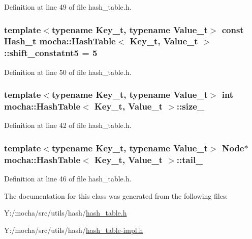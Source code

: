 Definition at line 49 of file hash\_\-table.h.

\hypertarget{classmocha_1_1_hash_table_a0c9f14cc6a29009848ff5e22ff5c77ae}{
\subsubsection[{shift\_\-constatnt5}]{\setlength{\rightskip}{0pt plus 5cm}template$<$typename Key\_\-t, typename Value\_\-t$>$ const {\bf Hash\_\-t} {\bf mocha::HashTable}$<$ Key\_\-t, Value\_\-t $>$::{\bf shift\_\-constatnt5} = 5}}
\label{classmocha_1_1_hash_table_a0c9f14cc6a29009848ff5e22ff5c77ae}


Definition at line 50 of file hash\_\-table.h.

\hypertarget{classmocha_1_1_hash_table_acfaea92a2c538b293ef7211b1018ef8e}{
\subsubsection[{size\_\-}]{\setlength{\rightskip}{0pt plus 5cm}template$<$typename Key\_\-t, typename Value\_\-t$>$ int {\bf mocha::HashTable}$<$ Key\_\-t, Value\_\-t $>$::{\bf size\_\-}}}
\label{classmocha_1_1_hash_table_acfaea92a2c538b293ef7211b1018ef8e}


Definition at line 42 of file hash\_\-table.h.

\hypertarget{classmocha_1_1_hash_table_a2a2427ab0f6c9e70b381e9915d3e64ef}{
\subsubsection[{tail\_\-}]{\setlength{\rightskip}{0pt plus 5cm}template$<$typename Key\_\-t, typename Value\_\-t$>$ {\bf Node}$\ast$ {\bf mocha::HashTable}$<$ Key\_\-t, Value\_\-t $>$::{\bf tail\_\-}}}
\label{classmocha_1_1_hash_table_a2a2427ab0f6c9e70b381e9915d3e64ef}


Definition at line 46 of file hash\_\-table.h.



The documentation for this class was generated from the following files:\begin{DoxyCompactItemize}
\item 
Y:/mocha/src/utils/hash/\hyperlink{hash__table_8h}{hash\_\-table.h}\item 
Y:/mocha/src/utils/hash/\hyperlink{hash__table-impl_8h}{hash\_\-table-\/impl.h}\end{DoxyCompactItemize}
